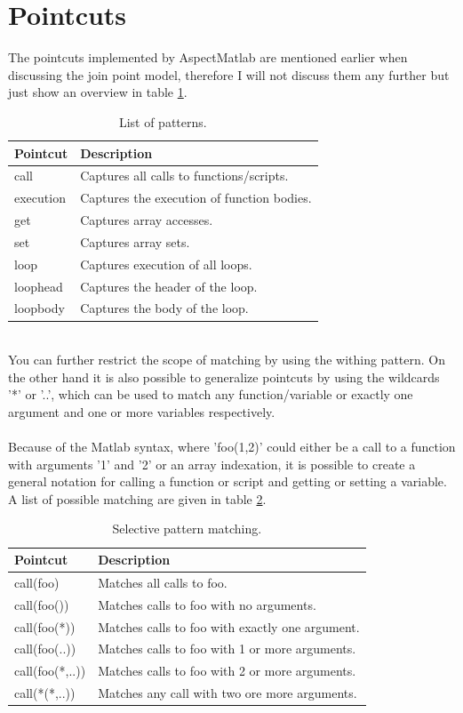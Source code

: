 \documentclass[a4paper]{report}
\begin{document}
\section{Pointcuts}
The pointcuts implemented by AspectMatlab are mentioned earlier when discussing the join point model, therefore I will not discuss them any further but just show an overview in table \ref{tab:Matlab_Patterns}.\\
\begin{table}
\centering
\begin{tabular}{l|l}
\hline
Pointcut & Description\\
\hline
\hline
call & Captures all calls to functions/scripts.\\
execution & Captures the execution of function bodies.\\
get & Captures array accesses.\\
set & Captures array sets.\\
loop & Captures execution of all loops.\\
loophead & Captures the header of the loop.\\
loopbody & Captures the body of the loop.\\
\hline
\end{tabular}
\caption{List of patterns.}
\label{tab:Matlab_Patterns}
\end{table}\\
You can further restrict the scope of matching by using the withing pattern. On the other hand it is also possible to generalize pointcuts by using the wildcards '*' or '..', which can be used to match any function/variable or exactly one argument and one or more variables respectively.\\
\\
Because of the Matlab syntax, where 'foo(1,2)' could either be a call to a function with arguments '1' and '2' or an array indexation, it is possible to create a general notation for calling a function or script and getting or setting a variable. A list of possible matching are given in table \ref{tab:Matlab_PatternExamples}.\\
\begin{table}
\centering
\begin{tabular}{l|l}
\hline
Pointcut & Description\\
\hline
\hline
call(foo) & Matches all calls to foo.\\
call(foo()) & Matches calls to foo with no arguments.\\
call(foo(*)) & Matches calls to foo with exactly one argument.\\
call(foo(..)) & Matches calls to foo with 1 or more arguments.\\
call(foo(*,..)) & Matches calls to foo with 2 or more arguments.\\
call(*(*,..)) & Matches any call with two ore more arguments.\\
\hline
\end{tabular}
\caption{Selective pattern matching.}
\label{tab:Matlab_PatternExamples}
\end{table}\\
\end{document}
